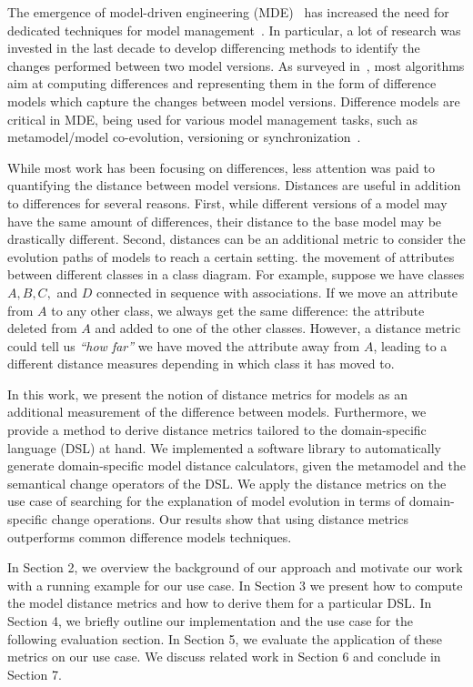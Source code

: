 
The emergence of model-driven engineering (MDE)~\cite{Schmidt2006a} has increased the need for dedicated techniques for model management~\cite{Kolovos2013a}.
In particular, a lot of research was invested in the last decade to develop differencing methods to identify the changes performed between two model versions.
As surveyed in~\cite{StephanC13}, most algorithms aim at computing differences and representing them in the form of difference models which capture the changes between model versions.
Difference models are critical in MDE, being used for various model management tasks, such as metamodel/model co-evolution, versioning or synchronization~\cite{Ruscio2012,Demuth2016}.

While most work has been focusing on differences, less attention was paid to quantifying the distance between model versions.
Distances are useful in addition to differences for several reasons.
First, while different versions of a model may have the same amount of differences, their distance to the base model may be drastically different.
Second, distances can be an additional metric to consider the evolution paths of models to reach a certain setting.
the movement of attributes between different classes in a class diagram.
For example, suppose we have classes $A,B,C,$ and $D$ connected in sequence with associations.
If we move an attribute from $A$ to any other class, we always get the same difference: the attribute deleted from $A$ and added to one of the other classes. However, a distance metric could tell us \textit{``how far''} we have moved the attribute away from $A$, leading to a different distance measures depending in which class it has moved to.

In this work, we present the notion of distance metrics for models as an additional measurement of the difference between models.
Furthermore, we provide a method to derive distance metrics tailored to the domain-specific language (DSL) at hand.
We implemented a software library to automatically generate domain-specific model distance calculators, given the metamodel and the semantical change operators of the DSL.
We apply the distance metrics on the use case of searching for the explanation of model evolution in terms of domain-specific change operations.
Our results show that using distance metrics outperforms common difference models techniques.

In Section 2, we overview the background of our approach and motivate our work with a running example for our use case.
In Section 3 we present how to compute the model distance metrics and how to derive them for a particular DSL.
In Section 4, we briefly outline our implementation and the use case for the following evaluation section.
In Section 5, we evaluate the application of these metrics on our use case.
We discuss related work in Section 6 and conclude in Section 7. 